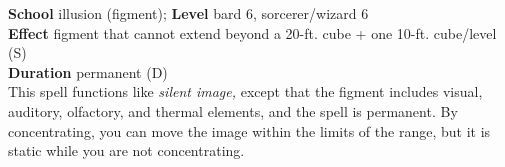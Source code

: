 \textbf{School} illusion (figment); \textbf{Level} bard 6, sorcerer/wizard 6\\
\textbf{Effect} figment that cannot extend beyond a 20-ft. cube + one 10-ft. cube/level (S)\\
\textbf{Duration} permanent (D)\\
This spell functions like \textit{silent image, }except that the figment includes visual, auditory, olfactory, and thermal elements, and the spell is permanent. By concentrating, you can move the image within the limits of the range, but it is static while you are not concentrating.\\
